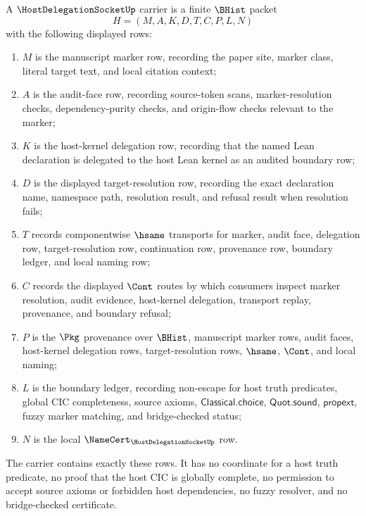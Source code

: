 \begin{definition}
\label{def:host-delegation-socket-carrier}
A $\HostDelegationSocketUp$ carrier is a finite $\BHist$ packet
$$
H=(M,A,K,D,T,C,P,L,N)
$$
with the following displayed rows:
\begin{enumerate}
\item $M$ is the manuscript marker row, recording the paper site, marker class, literal target text, and local citation context;
\item $A$ is the audit-face row, recording source-token scans, marker-resolution checks, dependency-purity checks, and origin-flow checks relevant to the marker;
\item $K$ is the host-kernel delegation row, recording that the named Lean declaration is delegated to the host Lean kernel as an audited boundary row;
\item $D$ is the displayed target-resolution row, recording the exact declaration name, namespace path, resolution result, and refusal result when resolution fails;
\item $T$ records componentwise $\hsame$ transports for marker, audit face, delegation row, target-resolution row, continuation row, provenance row, boundary ledger, and local naming row;
\item $C$ records the displayed $\Cont$ routes by which consumers inspect marker resolution, audit evidence, host-kernel delegation, transport replay, provenance, and boundary refusal;
\item $P$ is the $\Pkg$ provenance over $\BHist$, manuscript marker rows, audit faces, host-kernel delegation rows, target-resolution rows, $\hsame$, $\Cont$, and local naming;
\item $L$ is the boundary ledger, recording non-escape for host truth predicates, global CIC completeness, source axioms, $\mathsf{Classical.choice}$, $\mathsf{Quot.sound}$, $\mathsf{propext}$, fuzzy marker matching, and bridge-checked status;
\item $N$ is the local $\NameCert_{\HostDelegationSocketUp}$ row.
\end{enumerate}
The carrier contains exactly these rows. It has no coordinate for a host truth predicate, no proof that the host CIC is globally complete, no permission to accept source axioms or forbidden host dependencies, no fuzzy resolver, and no bridge-checked certificate.
\end{definition}

